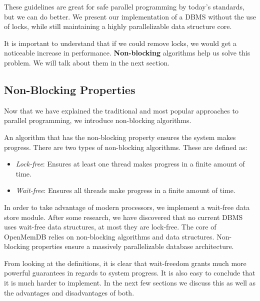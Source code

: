 \documentclass[letterpaper, 12pt]{article}
\begin{document}
These guidelines are great for safe parallel programming by today's standards, but we can do better. 
We present our implementation of a DBMS without the use of locks, while still maintaining a highly parallelizable data structure core.

\par\vspace{\baselineskip}

It is important to understand that if we could remove locks, we would get a noticeable increase in performance. 
{\bfseries Non-blocking} algorithms help us solve this problem. We will talk about them in the next section.

\subsection{Non-Blocking Properties}

Now that we have explained the traditional and most popular approaches to parallel programming, we introduce non-blocking algorithms.

\par\vspace{\baselineskip}
An algorithm that has the non-blocking property ensures the system makes progress. There are two types of non-blocking algorithms. These are defined as: 
\begin{itemize}
	\item \textit{Lock-free}: Ensures at least one thread makes progress in a finite amount of time.
	\item \textit{Wait-free}: Ensures all threads make progress in a finite amount of time. 
\end{itemize}
In order to take advantage of modern processors, we implement a wait-free data store module. 
After some research, we have discovered that no current DBMS uses wait-free data 
structures, at most they are lock-free. The core of OpenMemDB relies on non-blocking algorithms and data 
structures. Non-blocking properties ensure a massively parallelizable database architecture. 

\par\vspace{\baselineskip}

From looking at the definitions, it is clear that wait-freedom grants much more 
powerful guarantees in regards to system progress. It is also easy to conclude that 
it is much harder to implement. In the next few sections we discuss this as well as the 
advantages and disadvantages of both. 
\end{document}
